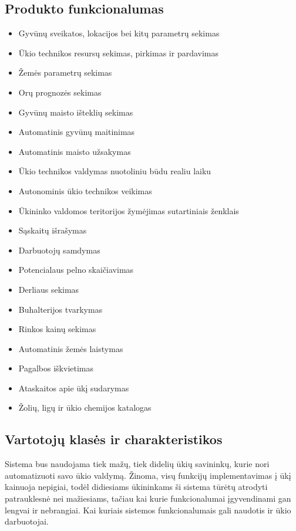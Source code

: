 \documentclass[oneside]{VUMIFPSkursinis}
\begin{document}
\subsection{Produkto funkcionalumas}
\begin{itemize}
	\item Gyvūnų sveikatos, lokacijos bei kitų parametrų sekimas
	\item Ūkio technikos resursų sekimas, pirkimas ir pardavimas
	\item Žemės parametrų sekimas
	\item Orų prognozės sekimas
	\item Gyvūnų maisto išteklių sekimas
	\item Automatinis gyvūnų maitinimas
	\item Automatinis maisto užsakymas
	\item Ūkio technikos valdymas nuotoliniu būdu realiu laiku
	\item Autonominis ūkio technikos veikimas
	\item Ūkininko valdomos teritorijos žymėjimas sutartiniais ženklais
	\item Sąskaitų išrašymas
	\item Darbuotojų samdymas
	\item Potencialaus pelno skaičiavimas
	\item Derliaus sekimas
	\item Buhalterijos tvarkymas
	\item Rinkos kainų sekimas
	\item Automatinis žemės laistymas
	\item Pagalbos iškvietimas
	\item Ataskaitos apie ūkį sudarymas
	\item Žolių, ligų ir ūkio chemijos katalogas
\end{itemize}
\subsection{Vartotojų klasės ir charakteristikos}
Sistema bus naudojama tiek mažų, tiek didelių ūkių savininkų, kurie nori automatizuoti savo ūkio valdymą. Žinoma, visų funkcijų implementavimas į ūkį kainuoja nepigiai, todėl didiesiams ūkininkams ši sistema tūrėtų atrodyti patrauklesnė nei mažiesiams, tačiau kai kurie funkcionalumai įgyvendinami gan lengvai ir nebrangiai. Kai kuriais sistemos funkcionalumais gali naudotis ir ūkio darbuotojai.
\end{document}
